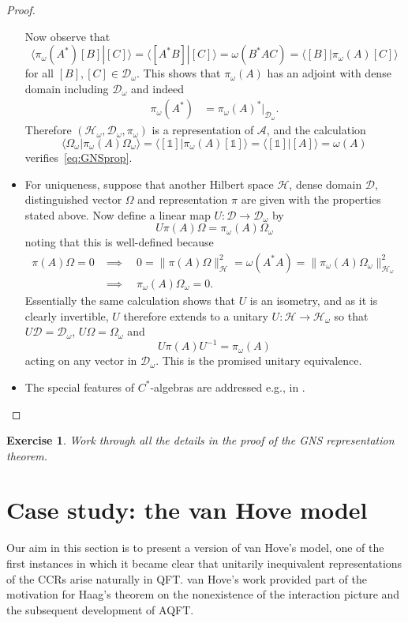 \documentclass[12pt,a4paper]{article}
\newcommand{\1}{\mathds{1}}                         %
\newcommand{\HH}{{\mathcal{H}}}
\newcommand{\DD}{{\mathscr{D}}}
\newcommand{\II}{{\mathbb{1}}}
\newcommand{\Ac}{{\mathcal{A}}}
\newcommand{\ip}[2]{\langle #1|#2\rangle}
\newtheorem{exercise}[theorem]{Exercise}
\begin{document}
\begin{proof}
\begin{itemize}
		Now observe that 
		\[
		\ip{\pi_\omega(A^*)[B]}{[C]} = \ip{[A^*B]}{[C]} =\omega(B^*AC) = \ip{[B]}{\pi_\omega(A)[C]}
		\] 
		for all $[B],[C]\in\DD_\omega$. This shows that $\pi_\omega(A)$ has an adjoint with dense domain including $\DD_\omega$ and indeed
		\begin{align*}
		\pi_\omega(A^*) &= \pi_\omega(A)^*|_{\DD_\omega}.
		\end{align*}
		Therefore $(\HH_\omega,\DD_\omega,\pi_\omega)$ is a representation of $\Ac$, and the calculation
		\[
		\ip{\Omega_\omega}{\pi_\omega(A)\Omega_\omega} = \ip{[\II]}{\pi_\omega(A)[\II]} = \ip{[\II]}{[A]}=\omega(A)
		\]
		verifies~\eqref{eq:GNSprop}. 
		\item For uniqueness, suppose that another Hilbert space $\HH$, dense domain $\DD$, distinguished vector $\Omega$ and representation $\pi$ are given with the properties stated above. Now define a linear map $U:\DD\to \DD_\omega$ by
		\[
		U\pi(A)\Omega = \pi_\omega(A)\Omega_\omega
		\]
		noting that this is well-defined because 
		\begin{align*}
		\pi(A)\Omega=0 & \implies \quad 0=\|\pi(A)\Omega\|_\HH^2=\omega(A^*A)=\|\pi_\omega(A)\Omega_\omega\|_{\HH_\omega}^2 \\
		&\implies\quad  \pi_\omega(A)\Omega_\omega = 0.
		\end{align*}
		Essentially the same calculation shows that $U$ is an isometry, and as it is clearly invertible, $U$ therefore extends to a unitary $U:\HH\to\HH_\omega$ so that $U\DD=\DD_\omega$, $U\Omega=\Omega_\omega$ and
		\[
		U\pi(A)U^{-1} = \pi_\omega(A)
		\]
		acting on any vector in $\DD_\omega$. This is the promised unitary equivalence.
		\item The special features of $C^*$-algebras are addressed e.g., in \cite[Prop.~2.3.3 and \S 2.3.3]{BratRob:vol1} .
	\end{itemize}
\end{proof}
\begin{exercise}
	Work through all the details in the proof of the GNS representation theorem.
\end{exercise}
	\section{Case study: the van Hove model}\label{sec:vH}
	
	Our aim in this section is to present a version of van Hove's model, one of the first instances in which it became clear that unitarily inequivalent representations of the CCRs arise naturally in QFT. van Hove's work provided part of the motivation for Haag's theorem on the nonexistence of the interaction picture and the subsequent development of AQFT.
	
\end{document}

